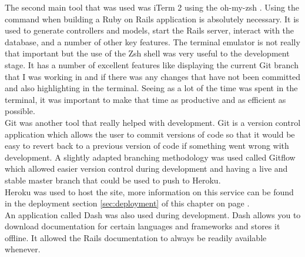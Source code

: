 The second main tool that was used was iTerm 2 \citep{iterm:2011} using the oh-my-zsh \citep{zsh:2009}. Using the command when building a Ruby on Rails application is absolutely necessary. It is used to generate controllers and models, start the Rails server, interact with the database, and a number of other key features. The terminal emulator is not really that important but the use of the Zsh shell was very useful to the development stage. It has a number of excellent features like displaying the current Git \citep{git:2014} branch that I was working in and if there was any changes that have not been committed and also highlighting in the terminal. Seeing as a lot of the time was spent in the terminal, it was important to make that time as productive and as efficient as possible.\\

Git was another tool that really helped with development. Git is a version control application which allows the user to commit versions of code so that it would be easy to revert back to a previous version of code if something went wrong with development. A slightly adapted branching methodology was used called Gitflow \citep{gitflow:2010} which allowed easier version control during development and having a live and stable master branch that could be used to push to Heroku.\\

Heroku \citep{heroku:2007} was used to host the site, more information on this service can be found in the deployment section \ref{sec:deployment} of this chapter on page \pageref{sec:deployment}.\\

An application called Dash \citep{dash:2014} was also used during development. Dash allows you to download documentation for certain languages and frameworks and stores it offline. It allowed the Rails documentation to always be readily available whenever.

